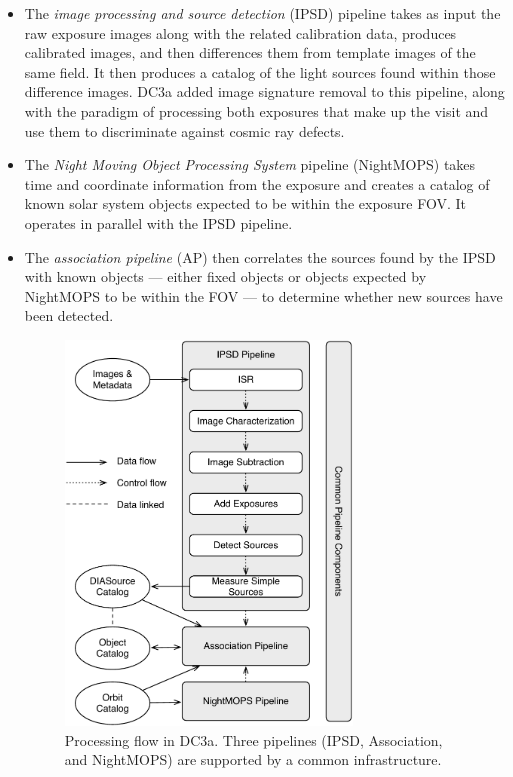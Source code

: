 \begin{itemize}

\item The \textit{image processing and source detection} (IPSD)
  pipeline takes as input the raw exposure images along with the
  related calibration data, produces calibrated images, and then
  differences them from template images of the same field.  It then
  produces a catalog of the light sources found within those
  difference images. DC3a added image signature removal to this
  pipeline, along with the paradigm of processing both exposures that
  make up the visit and use them to discriminate against cosmic ray
  defects.

\item The \textit{Night Moving Object Processing System} pipeline
  (NightMOPS) takes time and coordinate information from the exposure
  and creates a catalog of known solar system objects expected to be
  within the exposure FOV. It operates in parallel with the IPSD
  pipeline.

\item The \textit{association pipeline} (AP) then correlates the
  sources found by the IPSD with known objects --- either fixed
  objects or objects expected by NightMOPS to be within the FOV --- to
  determine whether new sources have been detected.

\begin{figure}[t]
\begin{center}
\includegraphics[width=3in]{images/DC3aNightly.pdf}
\caption{Processing flow in DC3a. Three pipelines (IPSD, Association, and
NightMOPS) are supported by a common infrastructure.  
\label{fig:dc3apipes}}
\end{center}
\end{figure}


\end{itemize}
